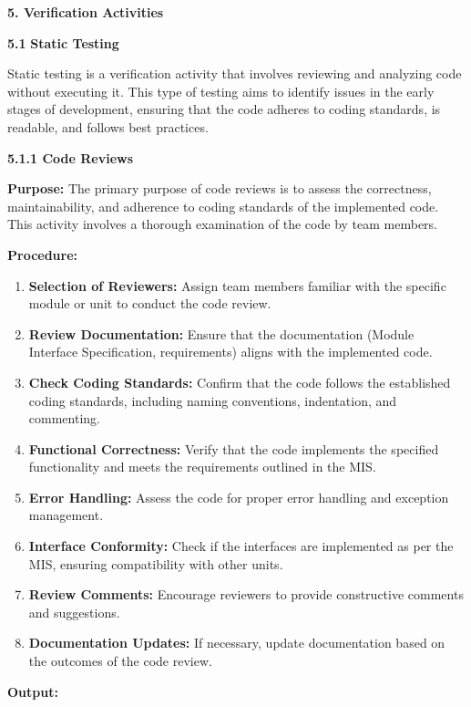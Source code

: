 \documentclass[
]{article}
\begin{document}
\protect\hypertarget{Acm}{}{}\textbf{5. Verification Activities}


\protect\hypertarget{Ad1}{}{}\textbf{5.1} \textbf{Static Testing}

Static testing is a verification activity that involves reviewing and
analyzing code without executing it. This type of testing aims to
identify issues in the early stages of development, ensuring that the
code adheres to coding standards, is readable, and follows best
practices.

\protect\hypertarget{Ad2}{}{}\textbf{5.1.1 Code Reviews}

\textbf{Purpose:} The primary purpose of code reviews is to assess the
correctness, maintainability, and adherence to coding standards of the
implemented code. This activity involves a thorough examination of the
code by team members.

\textbf{Procedure:}

\begin{enumerate}
\def\labelenumi{\arabic{enumi}.}
\item
  \textbf{Selection of Reviewers:} Assign team members familiar with the
  specific module or unit to conduct the code review.
\item
  \textbf{Review Documentation:} Ensure that the documentation (Module
  Interface Specification, requirements) aligns with the implemented
  code.
\item
  \textbf{Check Coding Standards:} Confirm that the code follows the
  established coding standards, including naming conventions,
  indentation, and commenting.
\item
  \textbf{Functional Correctness:} Verify that the code implements the
  specified functionality and meets the requirements outlined in the
  MIS.
\item
  \textbf{Error Handling:} Assess the code for proper error handling and
  exception management.
\item
  \textbf{Interface Conformity:} Check if the interfaces are implemented
  as per the MIS, ensuring compatibility with other units.
\item
  \textbf{Review Comments:} Encourage reviewers to provide constructive
  comments and suggestions.
\item
  \textbf{Documentation Updates:} If necessary, update documentation
  based on the outcomes of the code review.
\end{enumerate}

\textbf{Output:}
\end{document}
